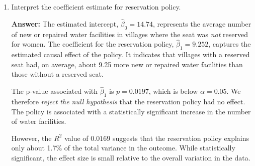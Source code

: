 \documentclass[12pt,letterpaper]{article}
\begin{document}
\begin{enumerate}
	\vspace{1cm}
	\item [(c)] Interpret the coefficient estimate for reservation policy. 
	
	\textbf{Answer:} 
	The estimated intercept, $\hat{\beta}_0 = 14.74$, represents the average number of new or repaired water facilities in villages where the seat was \textit{not} reserved for women. The coefficient for the reservation policy, $\hat{\beta}_1 = 9.252$, captures the estimated causal effect of the policy. It indicates that villages with a reserved seat had, on average, about 9.25 more new or repaired water facilities than those without a reserved seat. 
	
	The p-value associated with $\hat{\beta}_1$ is $p = 0.0197$, which is below $\alpha = 0.05$. We therefore \textit{reject the null hypothesis} that the reservation policy had no effect. The policy is associated with a statistically significant increase in the number of water facilities. 
	
	However, the $R^2$ value of $0.0169$ suggests that the reservation policy explains only about 1.7\% of the total variance in the outcome. While statistically significant, the effect size is small relative to the overall variation in the data.
	
\end{enumerate}
\end{document}

